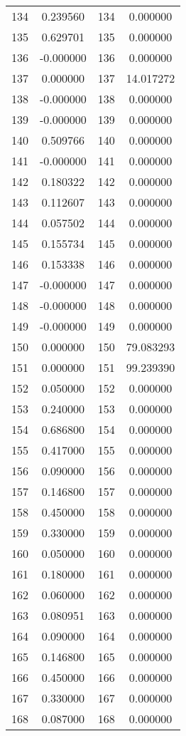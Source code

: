 \documentclass[12pt]{article}
\begin{document}
\begin{longtable}{@{}cccc@{}}
134 & 0.239560 & 134 & 0.000000 \\
135 & 0.629701 & 135 & 0.000000 \\
136 & -0.000000 & 136 & 0.000000 \\
137 & 0.000000 & 137 & 14.017272 \\
138 & -0.000000 & 138 & 0.000000 \\
139 & -0.000000 & 139 & 0.000000 \\
140 & 0.509766 & 140 & 0.000000 \\
141 & -0.000000 & 141 & 0.000000 \\
142 & 0.180322 & 142 & 0.000000 \\
143 & 0.112607 & 143 & 0.000000 \\
144 & 0.057502 & 144 & 0.000000 \\
145 & 0.155734 & 145 & 0.000000 \\
146 & 0.153338 & 146 & 0.000000 \\
147 & -0.000000 & 147 & 0.000000 \\
148 & -0.000000 & 148 & 0.000000 \\
149 & -0.000000 & 149 & 0.000000 \\
150 & 0.000000 & 150 & 79.083293 \\
151 & 0.000000 & 151 & 99.239390 \\
152 & 0.050000 & 152 & 0.000000 \\
153 & 0.240000 & 153 & 0.000000 \\
154 & 0.686800 & 154 & 0.000000 \\
155 & 0.417000 & 155 & 0.000000 \\
156 & 0.090000 & 156 & 0.000000 \\
157 & 0.146800 & 157 & 0.000000 \\
158 & 0.450000 & 158 & 0.000000 \\
159 & 0.330000 & 159 & 0.000000 \\
160 & 0.050000 & 160 & 0.000000 \\
161 & 0.180000 & 161 & 0.000000 \\
162 & 0.060000 & 162 & 0.000000 \\
163 & 0.080951 & 163 & 0.000000 \\
164 & 0.090000 & 164 & 0.000000 \\
165 & 0.146800 & 165 & 0.000000 \\
166 & 0.450000 & 166 & 0.000000 \\
167 & 0.330000 & 167 & 0.000000 \\
168 & 0.087000 & 168 & 0.000000 \\

\end{longtable}
\end{document}
